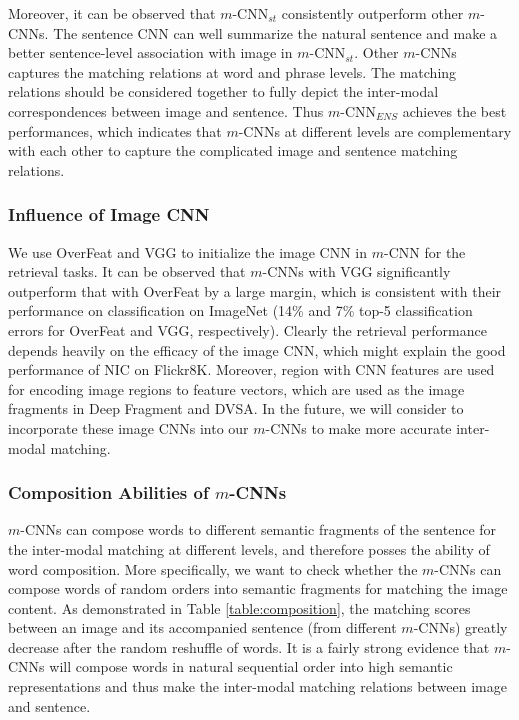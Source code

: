 \documentclass[10pt,twocolumn,letterpaper]{article}
\begin{document}
Moreover, it can be observed that $m$-CNN$_{st}$ consistently outperform other $m$-CNNs. The sentence CNN can well summarize the natural sentence and make a better sentence-level association with image in $m$-CNN$_{st}$. Other $m$-CNNs captures the matching relations at word and phrase levels. The matching relations should be considered together to fully depict the inter-modal correspondences between image and sentence. Thus $m$-CNN$_{ENS}$ achieves the best performances, which indicates that $m$-CNNs at different levels are complementary with each other to capture the complicated image and sentence matching relations.

\vspace{-3pt}
\subsubsection {Influence of Image CNN}
\label{sec:experiment:imagecnn}

We use OverFeat and VGG to initialize the image CNN in $m$-CNN for the retrieval tasks. It can be observed that $m$-CNNs with VGG significantly outperform that with OverFeat by a large margin, which is consistent with their performance on classification on ImageNet (14\% and 7\% top-5 classification errors for OverFeat and VGG, respectively). Clearly the retrieval performance depends heavily on the efficacy of the image CNN, which might explain the good performance of NIC on Flickr8K. Moreover, region with CNN features \cite{girshick_cvpr2014} are used for encoding image regions to feature vectors, which are used as the image fragments in Deep Fragment and DVSA. In the future, we will consider to incorporate these image CNNs into our $m$-CNNs to make more accurate inter-modal matching.


\vspace{-2pt}
\subsubsection {Composition Abilities of $m$-CNNs}
\label{sec:experiment:composition}



$m$-CNNs can compose words to different semantic fragments of the sentence for the inter-modal matching at different levels, and therefore posses the ability of word composition. More specifically, we want to check whether the $m$-CNNs can compose words of random orders into semantic fragments for matching the image content. As demonstrated in Table \ref{table:composition}, the matching scores between an image and its accompanied sentence (from different $m$-CNNs) greatly decrease after the random reshuffle of words. It is a fairly strong evidence that $m$-CNNs will compose words in natural sequential order into high semantic representations and thus make the inter-modal matching relations between image and sentence.
\end{document}
